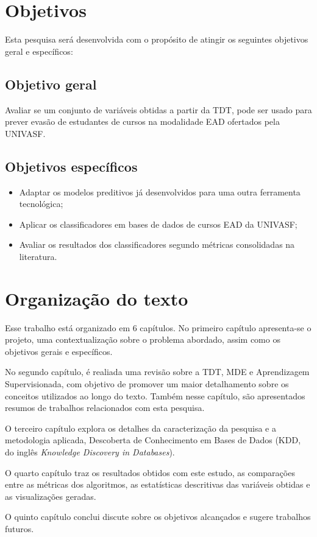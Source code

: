 \section{Objetivos}

Esta pesquisa será desenvolvida com o propósito de atingir os seguintes
objetivos geral e específicos:

\subsection{Objetivo geral}

Avaliar se um conjunto de variáveis obtidas a partir da TDT, pode ser usado para
prever evasão de estudantes de cursos na modalidade EAD ofertados pela UNIVASF.

\subsection{Objetivos específicos}
\begin{itemize}
  \item Adaptar os modelos preditivos já desenvolvidos para uma outra ferramenta
  tecnológica;
  \item Aplicar os classificadores em bases de dados de cursos EAD da UNIVASF;
  \item Avaliar os resultados dos classificadores segundo métricas consolidadas
  na literatura.
\end{itemize}

\section{Organização do texto}

Esse trabalho está organizado em 6 capítulos. No primeiro capítulo apresenta-se
o projeto, uma contextualização sobre o problema abordado, assim como os
objetivos gerais e específicos.

No segundo capítulo, é realiada uma revisão sobre a TDT, MDE e Aprendizagem
Supervisionada, com objetivo de promover um maior detalhamento sobre os
conceitos utilizados ao longo do texto. Também nesse capítulo, são apresentados
resumos de trabalhos relacionados com esta pesquisa.

O terceiro capítulo explora os detalhes da caracterização da pesquisa e a
metodologia aplicada, Descoberta de Conhecimento em Bases de Dados (KDD, do
inglês \textit{Knowledge Discovery in Databases}).

O quarto capítulo traz os resultados obtidos com este estudo, as comparações
entre as métricas dos algoritmos, as estatísticas descritivas das variáveis
obtidas e as visualizações geradas.

O quinto capítulo conclui discute sobre os objetivos alcançados e sugere
trabalhos futuros.
